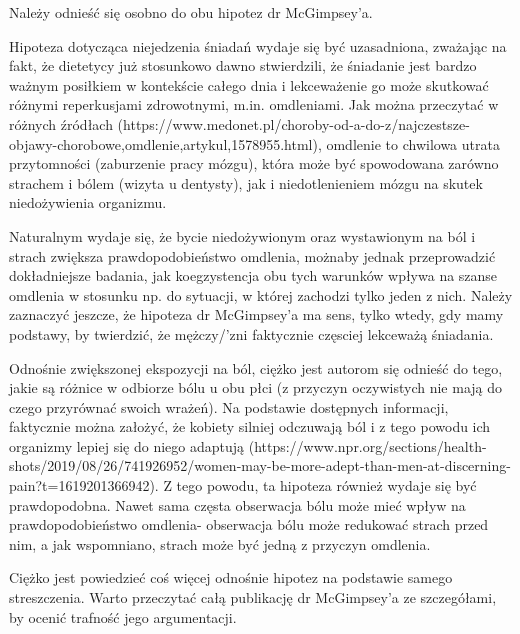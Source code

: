 \documentclass[11pt]{article}   %
\begin{document}
\par Należy odnieść się osobno do obu hipotez dr McGimpsey'a.
\par Hipoteza dotycząca niejedzenia śniadań wydaje się być uzasadniona, zważając na fakt, że dietetycy już stosunkowo dawno stwierdzili, że śniadanie jest bardzo ważnym posiłkiem w kontekście całego dnia i lekceważenie go może skutkować różnymi reperkusjami zdrowotnymi, m.in. omdleniami. Jak można przeczytać w różnych \'zródłach (https://www.medonet.pl/choroby-od-a-do-z/najczestsze-objawy-chorobowe,omdlenie,artykul,1578955.html), omdlenie to chwilowa utrata przytomności (zaburzenie pracy mózgu), która może być spowodowana zarówno strachem i bólem (wizyta u dentysty), jak i niedotlenieniem mózgu na skutek niedożywienia organizmu. \par Naturalnym wydaje się, że bycie niedożywionym oraz wystawionym na ból i strach zwiększa prawdopodobieństwo omdlenia, możnaby jednak przeprowadzić dokładniejsze badania, jak koegzystencja obu tych warunków wpływa na szanse omdlenia w stosunku np. do sytuacji, w której zachodzi tylko jeden z nich. Należy zaznaczyć jeszcze, że hipoteza dr McGimpsey'a ma sens, tylko wtedy, gdy mamy podstawy, by twierdzić, że mężczy/'zni faktycznie częsciej lekceważą śniadania.
\par Odnośnie zwiększonej ekspozycji na ból, ciężko jest autorom się odnieść do tego, jakie są różnice w odbiorze bólu u obu płci (z przyczyn oczywistych nie mają do czego przyrównać swoich wrażeń). Na podstawie dostępnych informacji, faktycznie można założyć, że kobiety silniej odczuwają ból i z tego powodu ich organizmy lepiej się do niego adaptują (https://www.npr.org/sections/health-shots/2019/08/26/741926952/women-may-be-more-adept-than-men-at-discerning-pain?t=1619201366942). Z tego powodu, ta hipoteza również wydaje się być prawdopodobna. Nawet sama częsta obserwacja bólu może mieć wpływ na prawdopodobieństwo omdlenia- obserwacja bólu może redukować strach przed nim, a jak wspomniano, strach może być jedną z przyczyn omdlenia.
\par Ciężko jest powiedzieć coś więcej odnośnie hipotez na podstawie samego streszczenia. Warto przeczytać całą publikację dr McGimpsey'a ze szczegółami, by ocenić trafność jego argumentacji.
\end{document}
